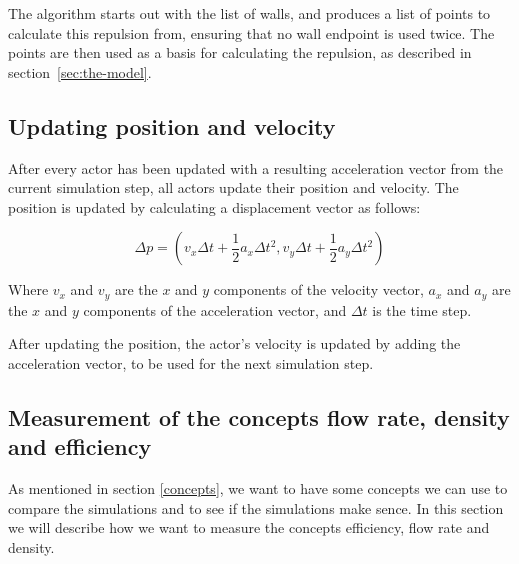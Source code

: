 The algorithm starts out with the list of walls, and produces a list of points 
to calculate this repulsion from, ensuring that no wall endpoint is used 
twice. The points are then used as a basis for calculating the repulsion, as 
described in section~\ref{sec:the-model}.

\subsection{Updating position and velocity}
After every actor has been updated with a resulting acceleration vector from 
the current simulation step, all actors update their position and velocity.  
The position is updated by calculating a displacement vector as follows:

\begin{equation}
    \Delta p = (v_x \Delta t + \frac{1}{2}a_x \Delta t^2, v_y \Delta t + 
    \frac{1}{2}a_y \Delta t^2)
\end{equation}

Where $v_x$ and $v_y$ are the $x$ and $y$ components of the velocity vector, 
$a_x$ and $a_y$ are the $x$ and $y$ components of the acceleration vector, and 
$\Delta t$ is the time step.

After updating the position, the actor's velocity is updated by adding the 
acceleration vector, to be used for the next simulation step.

%
%
%
%
%
%
%

\subsection{Measurement of the concepts flow rate, density and efficiency}
As mentioned in section \ref{concepts}, we want to have some concepts we can use to compare
the simulations and to see if the simulations make sence.
In this section we will describe how we want to measure the concepts efficiency,
flow rate and density.

